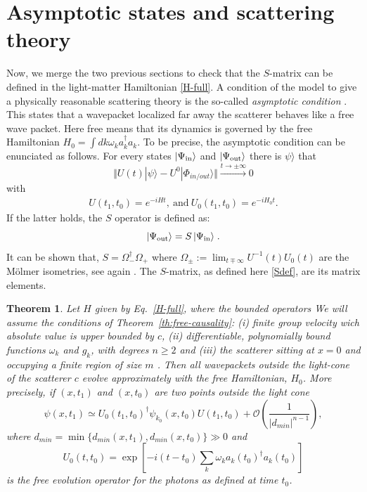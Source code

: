 \documentclass[notitlepage, prx, preprint, amsmath,superscriptaddress,amssymb]{revtex4-1}
\newtheorem{theorem}{Theorem}[section]
\begin{document}
\section{Asymptotic states and scattering theory}

Now, we merge the two previous sections to check that  the $S$-matrix can be defined in the   light-matter Hamiltonian \eqref{H-full}.   
A  condition of the model to give a physically reasonable scattering theory is the so-called \emph{asymptotic condition} \cite{Taylor1972}.  This   states that a wavepacket localized far away the scatterer behaves like a free wave packet.  Here free means that its dynamics is governed by the free Hamiltonian $H_0 = \int dk \omega_k a_k^\dagger a_k$. To be precise, the asymptotic condition can be enunciated as follows.  For every states $| \Psi_{\rm in} \rangle$ and $|\Psi_{\rm out} \rangle$ there is $\psi\rangle$ that
\begin{equation}
\Vert U(t) | \psi \rangle - U^0 |\Phi_{in /out} \rangle \Vert \stackrel{t\to \pm \infty}{\longrightarrow} 0
\end{equation}
with 
\begin{align}
U(t_1,t_0) = e^{-iH t },~\mbox{and}~ U_0(t_1,t_0)= e^{-iH_0 t }.
\end{align}
If the latter holds, the $S$ operator  is defined as:
\begin{equation}
\vert \Psi_{\rm out} \rangle = S \,  \vert \Psi_{\rm in} \rangle  \;.
\end{equation}
It can be shown that, $S = \Omega_-^\dagger \Omega_+$ where $\Omega_\pm := \lim_{t \mp \infty} U^{-1} (t) U_0 (t)$ are the M\"  olmer isometries, see again \cite{Taylor1972}. The $S$-matrix, as defined here \eqref{Sdef}, are its matrix elements. 
 
\begin{theorem}\label{th:int_evol}
Let $H$  given by Eq.\ \ref{H-full}, where the bounded operators  We will assume the conditions of Theorem\ \ref{th:free-causality}: (i)  finite group velocity wich absolute value is upper bounded by $c$,  (ii) differentiable, polynomially bound functions $\omega_k$ and $g_k$, with degrees $n\geq 2$ and (iii) the scatterer sitting at $x =0$ and occupying a finite region of size $m$ . Then all wavepackets outside the light-cone of the scatterer $c$ evolve approximately with the free Hamiltonian, $H_0$. More precisely, if $(x,t_1)$ and $(x,t_0)$ are two points outside the light cone
\begin{equation}
\psi(x,t_1) \simeq U_0(t_1,t_0)^\dagger\psi_{k_0}(x,t_0)U(t_1,t_0)
+\mathcal{O}\left(\frac{1}{|d_{min}|^{n-1}}\right),
\end{equation}
where $d_{min} = \min \{d_{min}(x,t_1),d_{min}(x,t_0)\}\gg 0$ and
\begin{equation}
U_0(t,t_0) = \exp\left[-i(t-t_0)\sum_k\omega_k a_k(t_0)^\dagger a_k(t_0)\right]
\end{equation}
is the free evolution operator for the photons as defined at time $t_0$.
\end{theorem}
\end{document}
